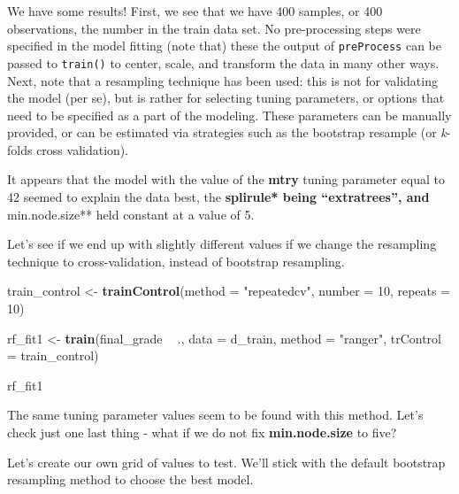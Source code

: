 \documentclass[]{book}
\newenvironment{Shaded}{\begin{snugshade}}{\end{snugshade}}
\newcommand{\KeywordTok}[1]{\textcolor[rgb]{0.13,0.29,0.53}{\textbf{#1}}}
\newcommand{\DataTypeTok}[1]{\textcolor[rgb]{0.13,0.29,0.53}{#1}}
\newcommand{\DecValTok}[1]{\textcolor[rgb]{0.00,0.00,0.81}{#1}}
\newcommand{\StringTok}[1]{\textcolor[rgb]{0.31,0.60,0.02}{#1}}
\newcommand{\OperatorTok}[1]{\textcolor[rgb]{0.81,0.36,0.00}{\textbf{#1}}}
\newcommand{\NormalTok}[1]{#1}
\begin{document}
We have some results! First, we see that we have 400 samples, or 400
observations, the number in the train data set. No pre-processing steps
were specified in the model fitting (note that) these the output of
\texttt{preProcess} can be passed to \texttt{train()} to center, scale,
and transform the data in many other ways. Next, note that a resampling
technique has been used: this is not for validating the model (per se),
but is rather for selecting tuning parameters, or options that need to
be specified as a part of the modeling. These parameters can be manually
provided, or can be estimated via strategies such as the bootstrap
resample (or \emph{k}-folds cross validation).

It appears that the model with the value of the \textbf{mtry} tuning
parameter equal to 42 seemed to explain the data best, the
\textbf{splirule* being ``extratrees'', and }min.node.size** held
constant at a value of 5.

Let's see if we end up with slightly different values if we change the
resampling technique to cross-validation, instead of bootstrap
resampling.

\begin{Shaded}
\begin{Highlighting}[]
\NormalTok{train_control <-}\StringTok{ }\KeywordTok{trainControl}\NormalTok{(}\DataTypeTok{method =} \StringTok{"repeatedcv"}\NormalTok{,}
                              \DataTypeTok{number =} \DecValTok{10}\NormalTok{,}
                              \DataTypeTok{repeats =} \DecValTok{10}\NormalTok{)}

\NormalTok{rf_fit1 <-}\StringTok{ }\KeywordTok{train}\NormalTok{(final_grade }\OperatorTok{~}\StringTok{ }\NormalTok{.,}
                \DataTypeTok{data =}\NormalTok{ d_train,}
                \DataTypeTok{method =} \StringTok{"ranger"}\NormalTok{,}
                \DataTypeTok{trControl =}\NormalTok{ train_control)}

\NormalTok{rf_fit1}
\end{Highlighting}
\end{Shaded}

The same tuning parameter values seem to be found with this method.
Let's check just one last thing - what if we do not fix
\textbf{min.node.size} to five?

Let's create our own grid of values to test. We'll stick with the
default bootstrap resampling method to choose the best model.
\end{document}
